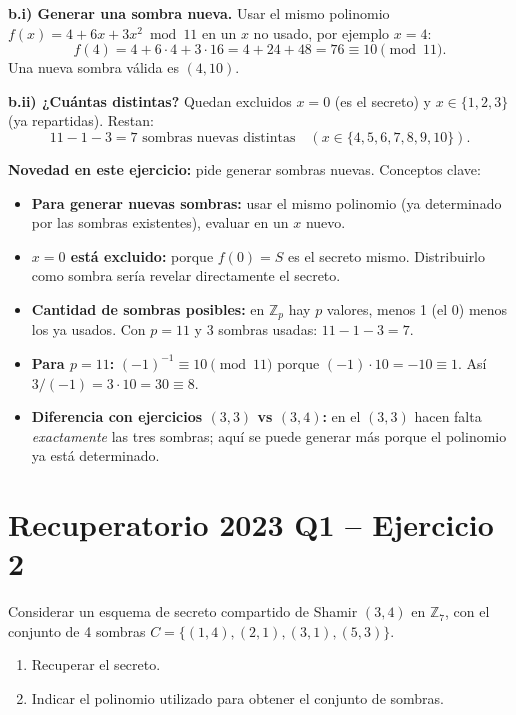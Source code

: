 \documentclass[11pt,a4paper]{article}
\begin{document}
\medskip
\textbf{b.i) Generar una sombra nueva.} Usar el mismo polinomio $f(x)=4+6x+3x^2 \bmod 11$ en un $x$ no usado, por ejemplo $x=4$:
\[
  f(4) = 4 + 6\cdot4 + 3\cdot16 = 4 + 24 + 48 = 76 \equiv \boxed{10} \pmod{11}.
\]
Una nueva sombra válida es $(4, 10)$.

\medskip
\textbf{b.ii) ¿Cuántas distintas?} Quedan excluidos $x=0$ (es el secreto) y $x\in\{1,2,3\}$ (ya repartidas). Restan:
\[
  11 - 1 - 3 = \boxed{7} \text{ sombras nuevas distintas} \quad (x \in \{4,5,6,7,8,9,10\}).
\]

\begin{tipsbox}
\textbf{Novedad en este ejercicio:} pide generar sombras nuevas. Conceptos clave:
\begin{itemize}
  \item \textbf{Para generar nuevas sombras:} usar el mismo polinomio (ya determinado por las sombras existentes), evaluar en un $x$ nuevo.
  \item \textbf{$x=0$ está excluido:} porque $f(0)=S$ es el secreto mismo. Distribuirlo como sombra sería revelar directamente el secreto.
  \item \textbf{Cantidad de sombras posibles:} en $\mathbb{Z}_p$ hay $p$ valores, menos 1 (el 0) menos los ya usados. Con $p=11$ y 3 sombras usadas: $11-1-3=7$.
  \item \textbf{Para $p=11$:} $(-1)^{-1} \equiv 10 \pmod{11}$ porque $(-1)\cdot 10 = -10 \equiv 1$. Así $3/(-1) = 3\cdot 10 = 30 \equiv 8$.
  \item \textbf{Diferencia con ejercicios $(3,3)$ vs $(3,4)$:} en el $(3,3)$ hacen falta \emph{exactamente} las tres sombras; aquí se puede generar más porque el polinomio ya está determinado.
\end{itemize}
\end{tipsbox}

\section{Recuperatorio 2023 Q1 -- Ejercicio 2}
\label{sec:2023}

\begin{consignabox}
Considerar un esquema de secreto compartido de Shamir $(3,4)$ en $\mathbb{Z}_7$, con el conjunto de 4 sombras $C = \{(1,4),(2,1),(3,1),(5,3)\}$.
\begin{enumerate}
  \item[a)] Recuperar el secreto.
  \item[b)] Indicar el polinomio utilizado para obtener el conjunto de sombras.
\end{enumerate}
\end{consignabox}
\end{document}
